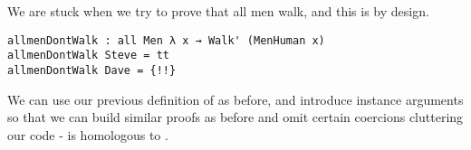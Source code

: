 \begin{code}[hide]%
\>[0]\AgdaSpace{}%
\AgdaSpace{}%
\AgdaSymbol{:}\AgdaSpace{}%
\AgdaSpace{}%
\<%
\end{code}
\begin{code}%
\>[0]\AgdaSpace{}%
\AgdaSymbol{:}\AgdaSpace{}%
\AgdaSpace{}%
\AgdaSpace{}%
\<%
\\
\>[0]\AgdaSpace{}%
\AgdaSymbol{(}\AgdaSpace{}%
\AgdaSymbol{)}\AgdaSpace{}%
\AgdaSymbol{=}\AgdaSpace{}%
\<%
\\
\>[0]\AgdaSpace{}%
\AgdaSymbol{(}\AgdaSpace{}%
\AgdaSymbol{)}\AgdaSpace{}%
\AgdaSymbol{=}\AgdaSpace{}%
\<%
\\
\>[0]\AgdaSpace{}%
\AgdaSymbol{(}\AgdaSpace{}%
\AgdaSymbol{)}\AgdaSpace{}%
\AgdaSymbol{=}\AgdaSpace{}%
\<%
\\
%
\\[\AgdaEmptyExtraSkip]%
\>[0]\AgdaSpace{}%
\AgdaSymbol{:}\AgdaSpace{}%
\AgdaSpace{}%
\AgdaSpace{}%
\AgdaSpace{}%
\AgdaSpace{}%
\AgdaSpace{}%
\AgdaSpace{}%
\AgdaSymbol{(}\AgdaSpace{}%
\AgdaSymbol{)}\<%
\\
\>[0]\AgdaSpace{}%
\AgdaSpace{}%
\AgdaSymbol{=}\AgdaSpace{}%
\<%
\\
\>[0]\AgdaSpace{}%
\AgdaSpace{}%
\AgdaSymbol{=}\AgdaSpace{}%
\<%
\end{code}

We are stuck when we try to prove that all men walk, and this is by design.

\begin{verbatim}
allmenDontWalk : all Men λ x → Walk' (MenHuman x)
allmenDontWalk Steve = tt
allmenDontWalk Dave = {!!}
\end{verbatim}

We can use our previous definition of  as before, and introduce
instance arguments so that we can build similar proofs as before and omit
certain coercions cluttering our code -  is homologous to
.

